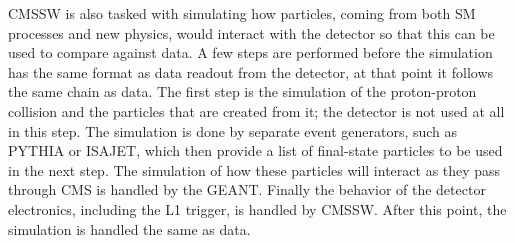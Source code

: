 CMSSW is also tasked with simulating how particles, coming from both SM processes and new physics, would interact with the detector so that this can be used to
compare against data. A few steps are performed before the simulation has the same format as data readout from the detector, at that
point it follows the same chain as data. The first step is the simulation of the proton-proton collision
and the particles that are created from it; the detector is not used at all in this step. 
The simulation is done by separate event generators, such as PYTHIA or ISAJET, which then provide a list of final-state particles to be used in the next step.
The simulation of how these particles will interact as they pass through CMS is handled by the GEANT.
Finally the behavior of the detector electronics, including the L1 trigger, is handled by CMSSW.
After this point, the simulation is handled the same as data.
